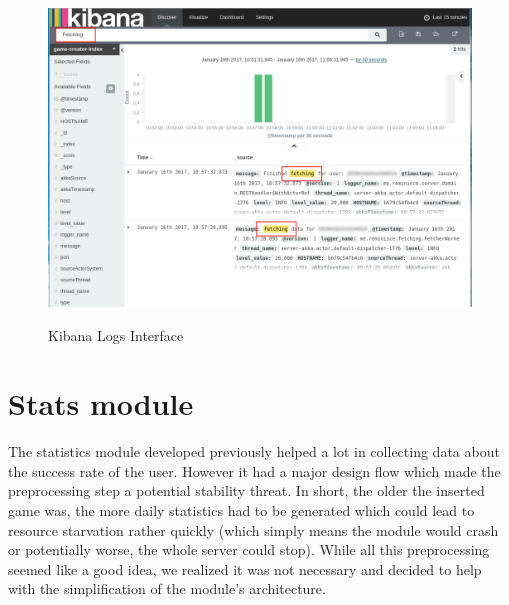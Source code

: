 \begin{figure}
\centering
{\includegraphics[width=6in]{images/kibana.png}}
\caption{Kibana Logs Interface}
\label{fig:kibana}
\end{figure}


\section{Stats module}\label{sec:stats}
The statistics module developed previously helped a lot in collecting data about the success rate of the user. However it had a major design flow which made the preprocessing step a potential stability threat. In short, the older the inserted game was, the more daily statistics had to be generated which could lead to resource starvation rather quickly (which simply means the module would crash or potentially worse, the whole server could stop). While all this preprocessing seemed like a good idea, we realized it was not necessary and decided to help with the simplification of the module's architecture.
